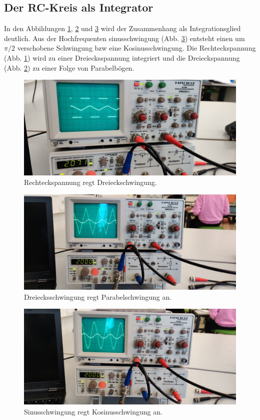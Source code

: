 \subsection{Der RC-Kreis als Integrator}
In den Abbildungen \ref{fig:Rechteck}, \ref{fig:dreieck} und \ref{fig:Sinus} wird der Zusammenhang als Integrationsglied deutlich.
Aus der Hochfrequenten sinusschwingung (Abb. \ref{fig:Sinus}) entsteht einen um $\pi / 2$ verschobene Schwingung bzw eine Kosinusschwingung.
Die Rechteckspannung (Abb. \ref{fig:Rechteck}) wird zu einer Dreiecksspannung integriert und die Dreieckspannung (Abb. \ref{fig:dreieck}) 
zu einer Folge von Parabelbögen.


\begin{figure}
    \includegraphics[width=\textwidth]{abbildungen/Rechtecksspannung.jpeg}
    \caption{Rechteckspannung regt Dreieckschwingung.}
    \label{fig:Rechteck}
\end{figure}
\begin{figure}
    \includegraphics[width=\textwidth]{abbildungen/DreiecksSchwingung.jpeg}
    \caption{Dreiecksschwingung regt Parabelschwingung an.}
    \label{fig:dreieck}
\end{figure}
\begin{figure}
    \includegraphics[width=\textwidth]{abbildungen/Sinusschwingung.jpeg}
    \caption{Sinusschwingung regt Kosinusschwingung an.}
    \label{fig:Sinus}
\end{figure}